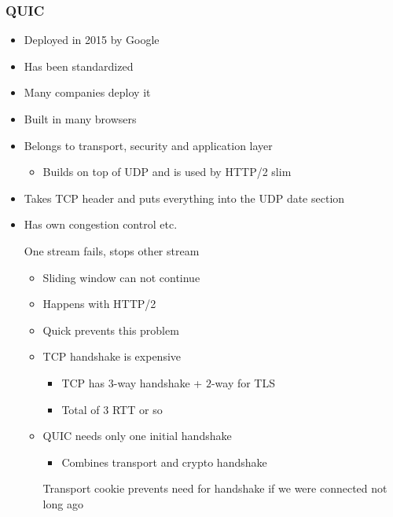\subsubsection{QUIC}
\begin{itemize}
    \item Deployed in 2015 by Google
    \item Has been standardized
    \item Many companies deploy it
    \item Built in many browsers
    \item Belongs to transport, security and application layer
        \begin{itemize}
            \item Builds on top of UDP and is used by HTTP/2 slim
        \end{itemize}
    \item Takes TCP header and puts everything into the UDP date section
    \item Has own congestion control etc.
        \begin{itemize}
             One stream fails, stops other stream
                \begin{itemize}
                    \item Sliding window can not continue
                    \item Happens with HTTP/2
                    \item Quick prevents this problem
                \end{itemize}
                \begin{itemize}
                    \item TCP handshake is expensive
                        \begin{itemize}
                            \item TCP has $3$-way handshake + $2$-way for TLS
                            \item Total of $3$ RTT or so
                        \end{itemize}
                    \item QUIC needs only one initial handshake
                        \begin{itemize}
                            \item Combines transport and crypto handshake
                        \end{itemize}
                     Transport cookie prevents need for handshake if we were connected not long ago

\end{itemize}
\end{itemize}
\end{itemize}
